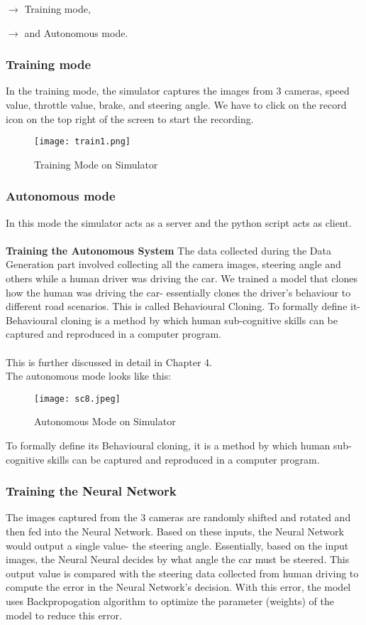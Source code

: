 $\to$ Training mode,
 
$\to$ and Autonomous mode.
\subsubsection{Training mode}
In the training mode, the simulator captures the images from 3 cameras, speed value, throttle value, brake, and steering angle. We have to click on the record icon on the top right of the screen to start the recording.
\begin{figure}[H]
	\centering
	\texttt{[image: train1.png]}
	\caption{Training Mode on Simulator}
\end{figure}

\subsubsection{Autonomous mode}
In this mode the simulator acts as a server and the python script acts as client. \\\\
{\textbf{Training the Autonomous System}}
The data collected during the Data Generation part involved collecting all the camera images, steering angle and others while a human driver was driving the car. We trained a model that clones how the human was driving the car- essentially clones the driver’s behaviour to different road scenarios. This is called Behavioural Cloning. To formally define it- Behavioural cloning is a method by which human sub-cognitive skills can be captured and reproduced in a computer program.\\\\
This is further discussed in detail in Chapter 4.\\
The autonomous mode looks like this:
\begin{figure}[H]
	\centering
	\texttt{[image: sc8.jpeg]}
	\caption{Autonomous Mode on Simulator}
\end{figure}

To formally define its Behavioural cloning, it is a method by which human sub-cognitive skills can be captured and reproduced in a computer program.

\subsubsection{Training the Neural Network}
The images captured from the 3 cameras are randomly shifted and rotated and then fed into the Neural Network. Based on these inputs, the Neural Network would output a single value- the steering angle. Essentially, based on the input images, the Neural Neural decides by what angle the car must be steered. This output value is compared with the steering data collected from human driving to compute the error in the Neural Network’s decision. With this error, the model uses Backpropogation algorithm to optimize the parameter (weights) of the model to reduce this error.\\

